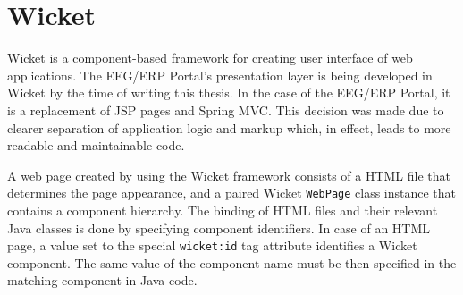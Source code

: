 \section{Wicket}

Wicket \cite{Wicket:Home} is a component-based framework for creating user interface of web applications. 
The EEG/ERP Portal's presentation layer is being developed in Wicket by the time of writing this thesis. 
In the case of the EEG/ERP Portal, it is a replacement of JSP pages and Spring MVC. 
This decision was made due to clearer separation of application logic and markup which, in effect, leads to more readable and maintainable code.

A web page created by using the Wicket framework consists of a HTML file that determines the page appearance, and a paired Wicket \texttt{WebPage} class instance that contains a component hierarchy. %
The binding of HTML files and their relevant Java classes is done by specifying component identifiers. In case of an HTML page, a value set to the special \texttt{wicket:id} tag attribute identifies a Wicket component. The same value of the component name must be then specified in the matching component in Java code.
